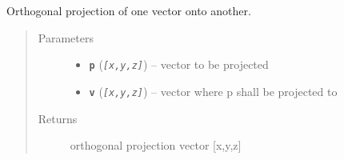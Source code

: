 \documentclass[letterpaper,10pt,english]{sphinxmanual}
\begin{document}
\begin{fulllineitems}
\label{pk_src.misc:pk_src.misc.project}
Orthogonal projection of one vector onto another.
\begin{quote}\begin{description}
\item[{Parameters}] \leavevmode\begin{itemize}
\item {} 
\textbf{\texttt{p}} (\emph{\texttt{{[}x,y,z{]}}}) -- vector to be projected

\item {} 
\textbf{\texttt{v}} (\emph{\texttt{{[}x,y,z{]}}}) -- vector where p shall be projected to

\end{itemize}

\item[{Returns}] \leavevmode
orthogonal projection vector {[}x,y,z{]}

\end{description}\end{quote}

\end{fulllineitems}

\end{document}
